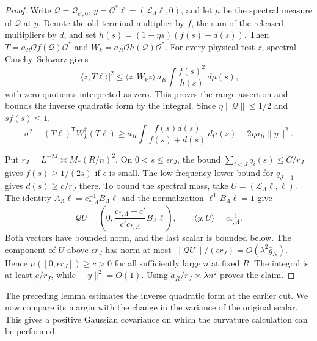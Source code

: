 \documentclass[11pt]{article}
\theoremstyle{definition}
\begin{document}
\begin{proof}
Write \(\mathcal Q=\mathcal Q_{c',0}\), \(y=\mathcal O^*\ell=
(\mathcal L_\Lambda\ell,0)\), and let \(\mu\) be the spectral
measure of \(\mathcal Q\) at \(y\). Denote the old terminal multiplier by
\(f\), the sum of the released multipliers by \(d\), and set
\(h(s)=(1-\eta s)(f(s)+d(s))\). Then
\(T=a_R\mathcal O f(\mathcal Q)\mathcal O^*\) and
\(W_k=a_R\mathcal O h(\mathcal Q)\mathcal O^*\).
For every physical test \(z\), spectral Cauchy--Schwarz gives
\begin{equation}
 |\langle z,T\ell\rangle|^2
 \le \langle z,W_k z\rangle\,
        a_R\int \frac{f(s)^2}{h(s)}\,d\mu(s),
\end{equation}
with zero quotients interpreted as zero. This proves the range
assertion and bounds the inverse quadratic form by the integral.
Since \(\eta\|\mathcal Q\|\le 1/2\) and \(s f(s)\le1\),
\begin{equation}
 \sigma^2-(T\ell)^{\mathsf T}W_k^\dagger(T\ell)
 \ge a_R\int\frac{f(s)d(s)}{f(s)+d(s)}\,d\mu(s)
                -2\eta a_R\|y\|^2.
\end{equation}

Put \(r_J=L^{-2J}\asymp M_*(R/n)^2\). On
\(0<s\le\epsilon r_J\), the bound
\(\sum_{i<J}q_i(s)\le C/r_J\) gives \(f(s)\ge 1/(2s)\)
if \(\epsilon\) is small. The low-frequency lower bound for
\(q_{J-1}\) gives \(d(s)\ge c/r_J\) there.
To bound the spectral mass, take \(U=(\mathcal L_\Lambda\ell,\ell)\).
The identity \(A_\Lambda\ell=c_{*,\Lambda}^{-1}B_\Lambda\ell\)
and the normalization \(\ell^{\mathsf T}B_\Lambda\ell=1\) give
\begin{equation}
 \mathcal Q U=\left(0,\frac{c_{*,\Lambda}-c'}{c'c_{*,\Lambda}}
                   B_\Lambda\ell\right),\qquad
 \langle y,U\rangle=c_{*,\Lambda}^{-1}.
\end{equation}
Both vectors have bounded norm, and the last scalar is bounded
below. The component of \(U\) above \(\epsilon r_J\) has norm
at most \(\|\mathcal Q U\|/(\epsilon r_J)=O(\lambda^2\bar g_N)\).
Hence \(\mu([0,\epsilon r_J])\ge c>0\) for all sufficiently
large \(n\) at fixed \(R\). The integral is at least
\(c/r_J\), while \(\|y\|^2=O(1)\). Using
\(a_R/r_J\asymp\lambda n^2\) proves the claim.
\end{proof}

The preceding lemma estimates the inverse quadratic form at the
earlier cut. We now compare its margin with the change in the
variance of the original scalar. This gives a positive Gaussian
covariance on which the curvature calculation can be performed.
\end{document}
